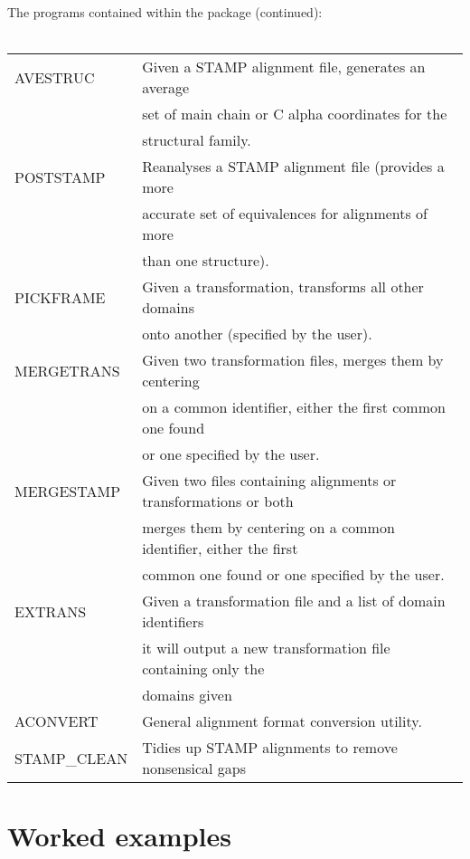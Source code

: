 \newpage
The programs contained within the package (continued):\\
\\
\begin{center}
\begin{tabular}{|ll|}
\hline
AVESTRUC & Given a STAMP alignment file, generates an average\\
         &    set of main chain or C alpha coordinates for the \\
         &    structural family.\\
\hline
POSTSTAMP & Reanalyses a STAMP alignment file (provides a more\\
          &   accurate set of equivalences for alignments of more\\
          &   than one structure).\\
\hline
PICKFRAME & Given a transformation, transforms all other domains \\ 
          &   onto another (specified by the user).\\
\hline
MERGETRANS & Given two transformation files, merges them by centering \\
           &  on a common identifier, either the first common one found\\
           &  or one specified by the user.\\
\hline
MERGESTAMP & Given two files containing alignments or transformations or both\\
           &  merges them by centering on a common identifier, either the first \\
           &  common one found or one specified by the user.\\
\hline
EXTRANS    & Given a transformation file and a list of domain identifiers \\
           &  it will output a new transformation file containing only the \\
           &  domains given \\
\hline
ACONVERT   & General alignment format conversion utility.\\
\hline
STAMP\_CLEAN & Tidies up STAMP alignments to remove nonsensical gaps\\
\hline
\end{tabular}
\end{center}


\chapter{Worked examples}

